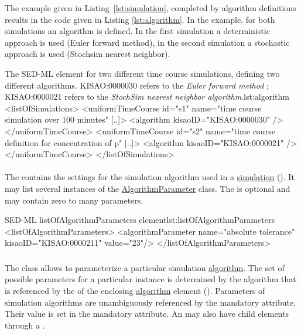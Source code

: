 The example given in Listing~\ref{lst:simulation}, completed by algorithm definitions results in the code given in Listing \ref{lst:algorithm}. In the example, for both simulations an algorithm is defined. In the first simulation  a deterministic approach is used (Euler forward method), in the second simulation  a stochastic approach is used (Stochsim nearest neighbor).

\begin{myXmlLst}{The SED-ML  element for two different time course simulations, defining two different algorithms. KISAO:0000030 refers to the \emph{Euler forward method} ; KISAO:0000021 refers to the \emph{StochSim nearest neighbor algorithm}.}{lst:algorithm}
<listOfSimulations>
	<uniformTimeCourse id="s1" name="time course simulation over 100 minutes" [..]>
		<algorithm kisaoID="KISAO:0000030" />
	</uniformTimeCourse>
	<uniformTimeCourse id="s2" name="time course definition for concentration of p" [..]>
		<algorithm kisaoID="KISAO:0000021" />
	</uniformTimeCourse>
</listOfSimulations>
\end{myXmlLst}


\paragraph*{}
\label{class:listOfAlgorithmParameters}
The  contains the settings for the simulation algorithm used in a \hyperref[class:simulation]{simulation} (). It may list several instances of the \hyperref[class:algorithmParameter]{AlgorithmParameter} class. The  is optional and may contain zero to many parameters.

\begin{myXmlLst}{SED-ML listOfAlgorithmParameters element}{lst:listOfAlgorithmParameters}
<listOfAlgorithmParameters>
	<algorithmParameter name="absolute tolerance" kisaoID="KISAO:0000211" value="23"/> 
</listOfAlgorithmParameters>
\end{myXmlLst}


\subsubsection{}
\label{class:algorithmParameter}
The  class allows to parameterize a particular simulation \hyperref[class:algorithm]{algorithm}. The set of possible parameters for a particular instance is determined by the algorithm that is referenced by the  of the enclosing \hyperref[class:algorithm]{algorithm} element (). Parameters of simulation algorithms are unambiguously referenced by the mandatory  attribute. Their value is set in the mandatory \hyperref[sec:algorithmParameterValue]{} attribute.  An \AlgorithmParameter may also have child \AlgorithmParameter elements through a \ListOfAlgorithmParameters.

